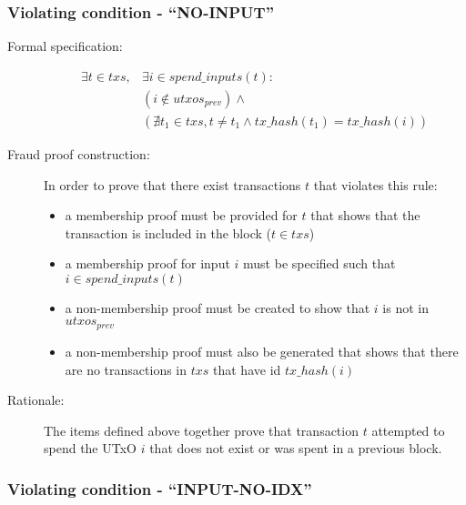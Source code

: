 \documentclass[../midgard.tex]{subfiles}
\begin{document}
\subsubsection{Violating condition - ``NO-INPUT''}
\label{sec:NO-INPUT}

\begin{description}

\item[Formal specification:]
\begin{equation*}
\begin{split}
    \exists t \in txs, &\exists i \in spend\_inputs(t): \\
    &( i \notin utxos_{prev} ) \land  \\
    &( \nexists t_1 \in txs, t \neq t_1 \land tx\_hash(t_1) = tx\_hash(i) )
\end{split}
\end{equation*}

\item[Fraud proof construction:] In order to prove that there exist transactions $t$ that violates this rule:
\begin{itemize}
    \item a membership proof must be provided for $t$ that shows that the transaction is included in the block ($t \in txs$)
    \item a membership proof for input $i$ must be specified such that $i \in spend\_inputs(t)$
    \item a non-membership proof must be created to show that $i$ is not in $utxos_{prev}$
    \item a non-membership proof must also be generated that shows that there are no transactions in $txs$ that have id $tx\_hash(i)$
\end{itemize}

\item[Rationale:] The items defined above together prove that transaction $t$ attempted to spend the UTxO $i$ that does not exist or was spent in a previous block.

\end{description}

\subsubsection{Violating condition - ``INPUT-NO-IDX''}
\label{sec:INPUT-NO-IDX}
\end{document}
